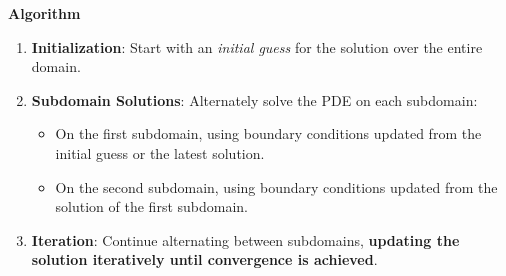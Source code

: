 \highspace
\begin{flushleft}
    \textcolor{Green3}{ \textbf{Algorithm}}
\end{flushleft}
\begin{enumerate}
    \item \textbf{Initialization}: Start with an \emph{initial guess} for the solution over the entire domain.
    \item \textbf{Subdomain Solutions}: Alternately solve the PDE on each subdomain:
    \begin{itemize}
        \item On the first subdomain, using boundary conditions updated from the initial guess or the latest solution.
        \item On the second subdomain, using boundary conditions updated from the solution of the first subdomain.
    \end{itemize}
    \item \textbf{Iteration}: Continue alternating between subdomains, \textbf{updating the solution iteratively until convergence is achieved}.
\end{enumerate}

